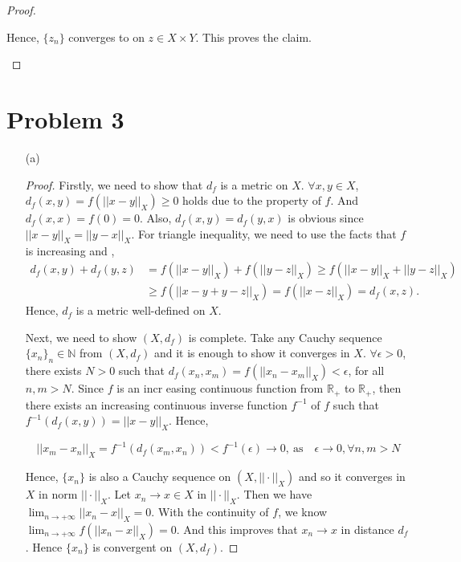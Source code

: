 \documentclass[12pt]{article}
\begin{document}
\begin{proof}
\begin{enumerate}
Hence, $\{z_n\}$ converges to on $z\in X\times Y$. This proves the claim.




\end{enumerate}


\end{proof}


\section*{Problem 3}

\begin{enumerate}
\item [(a)]

\begin{proof}

Firstly, we need to show that $d_f$ is a metric on $X$. $\forall x, y\in X$, $d_f(x, y) = f(||x - y||_X) \geqslant 0$ holds due to the property of $f$. And $d_f(x, x) = f(0) = 0$. Also, $d_f(x, y) = d_f(y, x)$ is obvious since $||x - y||_X = ||y - x||_X$. For triangle inequality, we need to use the facts that $f$ is increasing and ,
$$
\begin{aligned}
d_f(x, y) + d_f(y, z) & = f(||x-y||_X) + f(||y-z||_X)  \geqslant f(||x-y||_X + ||y-z||_X)\\
& \geqslant f(||x-y + y-z||_X) = f(||x-z||_X) = d_f(x, z).
\end{aligned}
$$
Hence, $d_f$ is a metric well-defined on $X$.

Next, we need to show $(X, d_f)$ is complete. Take any Cauchy sequence $\{x_n\}_n\in\mathbb N$ from $(X, d_f)$ and it is enough to show it converges in $X$. $\forall \epsilon > 0$, there exists $N > 0$ such that $d_f(x_n, x_m) = f(||x_n - x_m||_X) < \epsilon$, for all $n, m > N$. Since $f$ is an incr easing continuous function from $\mathbb R_+$ to $\mathbb R_+$, then there exists an increasing continuous inverse function $f^{-1}$ of $f$ such that $f^{-1}(d_f(x, y)) = ||x - y||_X$. Hence,

$$
||x_m - x_n||_X = f^{-1}(d_f(x_m, x_n)) < f^{-1}(\epsilon) \rightarrow 0,\  \text{as} \quad \epsilon \rightarrow 0, \forall n, m > N
$$

Hence, $\{x_n\}$ is also a Cauchy sequence on $(X, ||\cdot||_X)$ and so it converges in $X$ in norm $||\cdot||_X$. Let $x_n\rightarrow x\in X$ in $||\cdot||_X$. Then we have $\lim_{n\rightarrow +\infty } ||x_n - x||_X = 0$. With the continuity of $f$, we know $\lim_{n\rightarrow +\infty } f(||x_n - x||_X) = 0$. And this improves that $x_n\rightarrow x$ in distance $d_f$. Hence $\{x_n\}$ is convergent on $(X, d_f)$.


\end{proof}
\end{enumerate}
\end{document}
